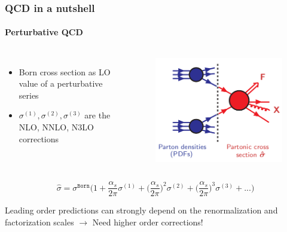 \documentclass[aspectratio=43]{beamer}
\begin{document}
\begin{frame}

	\frametitle{QCD in a nutshell}
	\framesubtitle{Perturbative QCD}
	
	\begin{columns}
		
		
		\begin{itemize}
			\item Born cross section as LO value of a perturbative series
			\item $\sigma^{(1)}, \sigma^{(2)}, \sigma^{(3)}$ are the NLO, NNLO, N3LO corrections
		\end{itemize}
		
		\begin{figure}[!htb]
			\includegraphics[width = 5 cm]{plots/factorization_3.png}
		\end{figure}
	
	\end{columns}
	
	\begin{equation}
		\hat{\sigma} = \sigma^{\texttt{Born}} \Bigg( 1 +
		\frac{\alpha_{s}}{2\pi} \sigma^{(1)} + 
		\Big(\frac{\alpha_{s}}{2\pi}\Big)^{2} \sigma^{(2)} + 
		\Big(\frac{\alpha_{s}}{2\pi}\Big)^{3} \sigma^{(3)} + ... \Bigg) \nonumber
	\end{equation}
	
	Leading order predictions can strongly depend on the renormalization and factorization scales $\rightarrow$ {\color{red}Need higher order corrections!}

\end{frame}

\begin{frame}


\end{frame}
\end{document}
